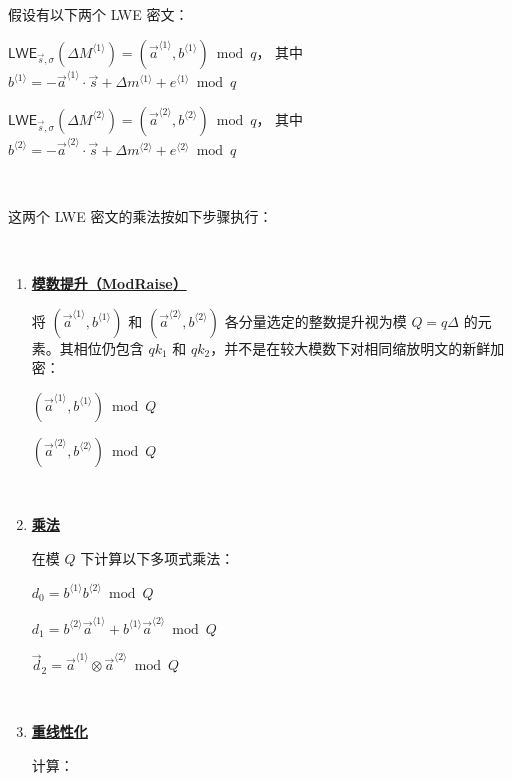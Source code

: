 \begin{tcolorbox}[title={\textbf{\tboxlabel{\ref*{subsubsec:bfv-mult-cipher-tfhe}} 分层 LWE 张量乘法}}]


假设有以下两个 LWE 密文：

$\textsf{LWE}_{\vec{s}, \sigma}(\Delta M^{\langle 1 \rangle}) = (\vec{a}^{\langle 1 \rangle}, b^{\langle 1 \rangle}) \bmod q$，\text{ } 其中 $b^{\langle 1 \rangle} = -\vec{a}^{\langle 1 \rangle} \cdot \vec{s} + \Delta m^{\langle 1 \rangle} + e^{\langle 1 \rangle} \bmod q$

$\textsf{LWE}_{\vec{s}, \sigma}(\Delta M^{\langle 2 \rangle}) = (\vec{a}^{\langle 2 \rangle}, b^{\langle 2 \rangle}) \bmod q$，\text{ } 其中 $b^{\langle 2 \rangle} = -\vec{a}^{\langle 2 \rangle} \cdot \vec{s} + \Delta m^{\langle 2 \rangle} + e^{\langle 2 \rangle} \bmod q$

$ $

这两个 LWE 密文的乘法按如下步骤执行：

$ $

\begin{enumerate}

\item \textbf{\underline{模数提升（\textsf{ModRaise}）}}

将 $(\vec{a}^{\langle 1 \rangle}, b^{\langle 1 \rangle})$ 和 $(\vec{a}^{\langle 2 \rangle}, b^{\langle 2 \rangle})$ 各分量选定的整数提升视为模 $Q=q\Delta$ 的元素。其相位仍包含 $qk_1$ 和 $qk_2$，并不是在较大模数下对相同缩放明文的新鲜加密：

$(\vec{a}^{\langle 1 \rangle}, b^{\langle 1 \rangle}) \bmod Q$

$(\vec{a}^{\langle 2 \rangle}, b^{\langle 2 \rangle}) \bmod Q$


$ $

\item \textbf{\underline{乘法}}

在模 $Q$ 下计算以下多项式乘法：

$d_0 = b^{\langle 1 \rangle}b^{\langle 2 \rangle} \bmod Q$

$d_1 = b^{\langle 2 \rangle}\vec{a}^{\langle 1 \rangle} +  b^{\langle 1 \rangle}\vec{a}^{\langle 2 \rangle} \bmod Q$

$\vec{d}_2 = \vec{a}^{\langle 1 \rangle} \otimes \vec{a}^{\langle 2 \rangle} \bmod Q$


$ $

\item \textbf{\underline{重线性化}}


计算：


\end{enumerate}
\end{tcolorbox}
